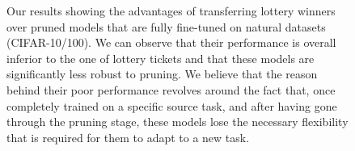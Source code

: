 \begin{figure}[ht!]


    \caption{Our results showing the advantages of transferring lottery winners over pruned models that are fully fine-tuned on natural datasets (CIFAR-10/100). We can observe that their performance is overall inferior to the one of lottery tickets and that these models are significantly less robust to pruning. We believe that the reason behind their poor performance revolves around the fact that, once completely trained on a specific source task, and after having gone through the pruning stage, these models lose the necessary flexibility that is required for them to adapt to a new task.}
    \label{fig:full_fine_tuning_comparison}
\end{figure} 
